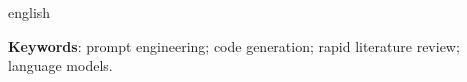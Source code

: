 \documentclass[12pt,oneside,a4paper,chapter=TITLE,english,brazil]{abntex2}
\newcommand{\niveisdemonografia}{%
  \let\MONOsection\section
  \let\MONOsubsection\subsection
  \let\MONOsubsubsection\subsubsection
  \renewcommand{\paragraph}{\MONOsubsubsection}%
  \renewcommand{\subsubsection}{\MONOsubsection}%
  \renewcommand{\subsection}{\MONOsection}%
  \renewcommand{\section}{\chapter}%
}
\begin{document}
\begin{resumo}[Abstract]
  \begin{otherlanguage*}{english}
  \SingleSpacing\noindent
  
  \par\vspace{\onelineskip}\noindent
  \textbf{Keywords}: prompt engineering; code generation; rapid literature review; language models.
  \end{otherlanguage*}
\end{resumo}

\listoftables*
\cleardoublepage

\begin{siglas}
  
\end{siglas}

\tableofcontents*
\cleardoublepage

\textual
\pagestyle{sonumero}
\niveisdemonografia








\postextual




\end{document}
